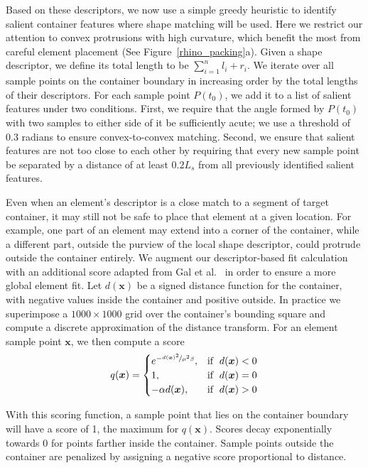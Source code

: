 Based on these descriptors, we now use a simple greedy heuristic to identify salient container features where shape matching will be used.
Here we restrict our attention to convex protrusions with high curvature, which benefit the most from careful element placement (See Figure~\ref{rhino_packing}a).  Given a shape descriptor, we define its total length to be $\sum_{i=1}^nl_i+r_i$.  We iterate over all sample points on the container boundary in increasing order by the total lengths of their descriptors.  For each sample point $P(t_0)$, we add it to a list of salient features under two conditions. First, we require that the angle formed by $P(t_0)$ with two samples to either side of it be sufficiently acute; we use a threshold of 0.3 radians to ensure convex-to-convex matching.
Second, we ensure that salient features are not too close to each other by requiring that every new sample point be separated by a distance of at least $0.2L_s$ from all previously identified salient features.

Even when an element's descriptor is a close match to a segment of 
target container, 
it may still not be safe to place that element at a given location.
For example, one part of an element may extend into a corner of the container,
while a different part, outside the purview of the local shape descriptor,
could protrude outside the container entirely.  We augment our 
descriptor-based fit calculation with an additional score adapted from
Gal et al.~\cite{Gal2007B} in order to ensure a more global element fit.
Let $d(\bm{x})$ be a signed distance function for the container, with
negative values inside the container and positive outside.  In practice we
superimpose a $1000\times 1000$ grid over the container's bounding square and
compute a discrete approximation of the distance transform.  For an element
sample point $\bm{x}$, we then compute a score
\begin{equation}
 q(\bm{x}) =\begin{cases}    
    e^{-\nicefrac{d(\bm{x})^2}{\mu^2\beta}}, & \mathrm{if} \;\; d(\bm{x}) < 0 \\
    1, & \mathrm{if} \;\;d(\bm{x}) = 0 \\
    - \alpha d(\bm{x}), & \mathrm{if}\;\; d(\bm{x}) > 0    
  \end{cases}
\end{equation}

With this scoring function, a sample point that lies on the container boundary
will have a score of 1, the maximum for $q(\bm{x})$.
Scores decay exponentially towards 0
for points farther inside the container.  Sample points outside the container
are penalized by assigning a negative score proportional to distance.

